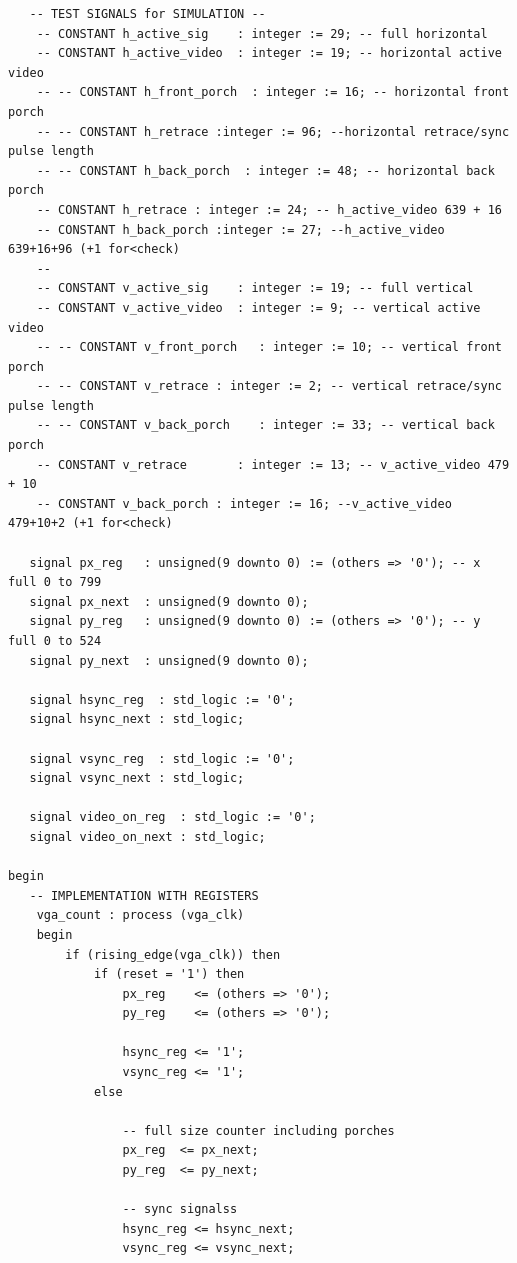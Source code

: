 \begin{verbatim}
   -- TEST SIGNALS for SIMULATION -- 
    -- CONSTANT h_active_sig    : integer := 29; -- full horizontal
    -- CONSTANT h_active_video  : integer := 19; -- horizontal active video
    -- -- CONSTANT h_front_porch  : integer := 16; -- horizontal front porch
    -- -- CONSTANT h_retrace :integer := 96; --horizontal retrace/sync pulse length
    -- -- CONSTANT h_back_porch  : integer := 48; -- horizontal back porch
    -- CONSTANT h_retrace : integer := 24; -- h_active_video 639 + 16
    -- CONSTANT h_back_porch :integer := 27; --h_active_video 639+16+96 (+1 for<check)
    -- 
    -- CONSTANT v_active_sig    : integer := 19; -- full vertical
    -- CONSTANT v_active_video  : integer := 9; -- vertical active video
    -- -- CONSTANT v_front_porch   : integer := 10; -- vertical front porch
    -- -- CONSTANT v_retrace : integer := 2; -- vertical retrace/sync pulse length
    -- -- CONSTANT v_back_porch    : integer := 33; -- vertical back porch
    -- CONSTANT v_retrace       : integer := 13; -- v_active_video 479 + 10
    -- CONSTANT v_back_porch : integer := 16; --v_active_video 479+10+2 (+1 for<check)

   signal px_reg   : unsigned(9 downto 0) := (others => '0'); -- x full 0 to 799
   signal px_next  : unsigned(9 downto 0);
   signal py_reg   : unsigned(9 downto 0) := (others => '0'); -- y full 0 to 524
   signal py_next  : unsigned(9 downto 0);
   
   signal hsync_reg  : std_logic := '0';
   signal hsync_next : std_logic;
   
   signal vsync_reg  : std_logic := '0';
   signal vsync_next : std_logic;
   
   signal video_on_reg  : std_logic := '0';
   signal video_on_next : std_logic;
   
begin
   -- IMPLEMENTATION WITH REGISTERS
    vga_count : process (vga_clk)
    begin
        if (rising_edge(vga_clk)) then
            if (reset = '1') then
                px_reg    <= (others => '0');
                py_reg    <= (others => '0');
               
                hsync_reg <= '1';
                vsync_reg <= '1';
            else
            
                -- full size counter including porches
                px_reg  <= px_next;
                py_reg  <= py_next;
                
                -- sync signalss
                hsync_reg <= hsync_next;
                vsync_reg <= vsync_next;
                

\end{verbatim}
